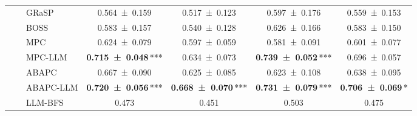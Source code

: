 \begin{table}[t]
\begin{tabular}{@{}cclcccc@{}}
     &  & GRaSP & \num{0.564 +- 0.159} & \num{0.517 +- 0.123} & \num{0.597 +- 0.176} & \num{0.559 +- 0.153} \\
     &  & BOSS & \num{0.583 +- 0.157} & \num{0.540 +- 0.128} & \num{0.626 +- 0.166} & \num{0.583 +- 0.150} \\
     &  & MPC & \num{0.624 +- 0.079} & \num{0.597 +- 0.059} & \num{0.581 +- 0.091} & \num{0.601 +- 0.077} \\
     &  & MPC-LLM & {\bfseries \num{0.715 +- 0.048}}\,\textnormal{***} & \num{0.634 +- 0.073} & {\bfseries \num{0.739 +- 0.052}}\,\textnormal{***} & \num{0.696 +- 0.057} \\
     &  & ABAPC & \num{0.667 +- 0.090} & \num{0.625 +- 0.085} & \num{0.623 +- 0.108} & \num{0.638 +- 0.095} \\
     &  & ABAPC-LLM & {\bfseries \num{0.720 +- 0.056}}\,\textnormal{***} & {\bfseries \num{0.668 +- 0.070}}\,\textnormal{***} & {\bfseries \num{0.731 +- 0.079}}\,\textnormal{***} & {\bfseries \num{0.706 +- 0.069}}\,\textnormal{*} \\
     &  & LLM-BFS & \num{0.473} & \num{0.451} & \num{0.503} & \num{0.475} \\
    \bottomrule
    \end{tabular}
\end{table}
